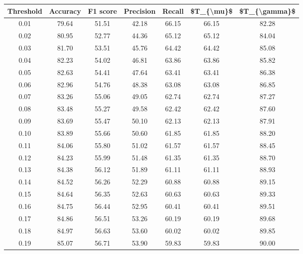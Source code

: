\begin{tabular}{|c|c|c|c|c|c|c|}
\hline
 Threshold &  Accuracy &  F1 score &  Precision &  Recall &  \$T\_\{\textbackslash mu\}\$ &  \$T\_\{\textbackslash gamma\}\$ \\
\hline
      0.01 &     79.64 &     51.51 &      42.18 &   66.15 &      66.15 &         82.28 \\
      0.02 &     80.95 &     52.77 &      44.36 &   65.12 &      65.12 &         84.04 \\
      0.03 &     81.70 &     53.51 &      45.76 &   64.42 &      64.42 &         85.08 \\
      0.04 &     82.23 &     54.02 &      46.81 &   63.86 &      63.86 &         85.82 \\
      0.05 &     82.63 &     54.41 &      47.64 &   63.41 &      63.41 &         86.38 \\
      0.06 &     82.96 &     54.76 &      48.38 &   63.08 &      63.08 &         86.85 \\
      0.07 &     83.26 &     55.06 &      49.05 &   62.74 &      62.74 &         87.27 \\
      0.08 &     83.48 &     55.27 &      49.58 &   62.42 &      62.42 &         87.60 \\
      0.09 &     83.69 &     55.47 &      50.10 &   62.13 &      62.13 &         87.91 \\
      0.10 &     83.89 &     55.66 &      50.60 &   61.85 &      61.85 &         88.20 \\
      0.11 &     84.06 &     55.80 &      51.02 &   61.57 &      61.57 &         88.45 \\
      0.12 &     84.23 &     55.99 &      51.48 &   61.35 &      61.35 &         88.70 \\
      0.13 &     84.38 &     56.12 &      51.89 &   61.11 &      61.11 &         88.93 \\
      0.14 &     84.52 &     56.26 &      52.29 &   60.88 &      60.88 &         89.15 \\
      0.15 &     84.64 &     56.35 &      52.63 &   60.63 &      60.63 &         89.33 \\
      0.16 &     84.75 &     56.44 &      52.95 &   60.41 &      60.41 &         89.51 \\
      0.17 &     84.86 &     56.51 &      53.26 &   60.19 &      60.19 &         89.68 \\
      0.18 &     84.97 &     56.63 &      53.60 &   60.02 &      60.02 &         89.85 \\
      0.19 &     85.07 &     56.71 &      53.90 &   59.83 &      59.83 &         90.00 \\

\end{tabular}
